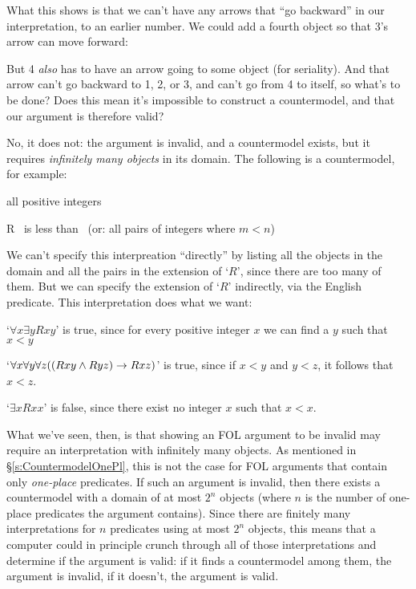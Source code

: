 What this shows is that we can't have any arrows that ``go backward'' in our interpretation, to an earlier number.  We could add a fourth object so that 3's arrow can move forward:
\begin{center}
\end{center}
But 4 \emph{also} has to have an arrow going to some object (for seriality).  And that arrow can't go backward to 1, 2, or 3, and can't go from 4 to itself, so what's to be done? Does this mean it's impossible to construct a countermodel, and that our argument is therefore valid?

No, it does not: the argument is invalid, and a countermodel exists, but it requires \emph{infinitely many objects} in its domain.  The following is a countermodel, for example:
\begin{ekey}
	\item[\text{Domain}] all positive integers
	\item[R] \blank \ is less than \blank \ (or: all pairs of integers  where $m < n$)
\end{ekey}
We can't specify this interpreation ``directly'' by listing all the objects in the domain and all the pairs in the extension of `$R$', since there are too many of them.  But we can specify the extension of `$R$' indirectly, via the English predicate. This interpretation does what we want:
\begin{ebullet}
\item `$\forall x\exists yRxy$' is true, since for every positive integer $x$ we can find a $y$ such that $x<y$
\item `$\forall x \forall y \forall z((Rxy \wedge Ryz) \rightarrow Rxz)$' is true, since if $x < y$ and $y < z$, it follows that $x < z$.
\item `$\exists xRxx$' is false, since there exist no integer $x$ such that $x < x$.
\end{ebullet}

What we've seen, then, is that showing an FOL argument to be invalid may require an interpretation with infinitely many objects.  As mentioned in \S\ref{s:CountermodelOnePl}, this is not the case for FOL arguments that contain only \emph{one-place} predicates.  If such an argument is invalid, then there exists a countermodel with a domain of at most $2^n$ objects (where $n$ is the number of one-place predicates the argument contains).  Since there are finitely many interpretations for $n$ predicates using at most $2^n$ objects, this means that a computer could in principle crunch through all of those interpretations and determine if the argument is valid: if it finds a countermodel among them, the argument is invalid, if it doesn't, the argument is valid.

